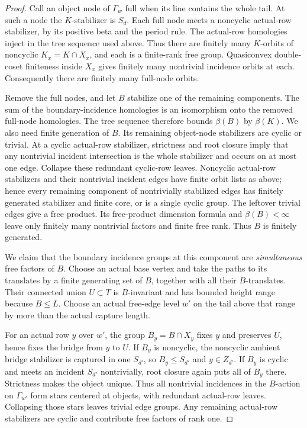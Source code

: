 \begin{proof}
Call an object node of $\Gamma_w$ full when its line contains the
whole tail. At such a node the $K$-stabilizer is $S_d$. Each full
node meets a noncyclic actual-row stabilizer, by its positive beta
and the period rule. The actual-row homologies inject in the tree
sequence used above. Thus there are finitely many $K$-orbits of
noncyclic $K_x=K\cap X_x$, and each is a finite-rank free group.
Quasiconvex double-coset finiteness inside $X_x$ gives finitely many
nontrivial incidence orbits at each. Consequently there are finitely
many full-node orbits.

Remove the full nodes, and let $B$ stabilize one of the remaining
components. The sum of the boundary-incidence homologies is an
isomorphism onto the removed full-node homologies. The tree sequence
therefore bounds $\beta(B)$ by $\beta(K)$. We also need finite
generation of $B$. Its remaining object-node stabilizers are cyclic
or trivial. At a cyclic actual-row stabilizer, strictness and root
closure imply that any nontrivial incident intersection is the whole
stabilizer and occurs on at most one edge. Collapse these redundant
cyclic-row leaves. Noncyclic actual-row stabilizers and their
nontrivial incident edges have finite orbit lists as above; hence
every remaining component of nontrivially stabilized edges has
finitely generated stabilizer and finite core, or is a single cyclic
group. The leftover trivial edges give a free product. Its
free-product dimension formula and $\beta(B)<\infty$ leave only
finitely many nontrivial factors and finite free rank. Thus $B$ is
finitely generated.

We claim that the boundary incidence groups at this component are
\emph{simultaneous} free factors of $B$. Choose an actual base vertex
and take the paths to its translates by a finite generating set of
$B$, together with all their $B$-translates. Their connected union
$U\subset T$ is $B$-invariant and has bounded height range because
$B\le L$. Choose an actual free-edge level $w'$ on the tail above
that range by more than the actual capture length.

For an actual row $y$ over $w'$, the group $B_y=B\cap X_y$ fixes
$y$ and preserves $U$, hence fixes the bridge from $y$ to $U$.
If $B_y$ is noncyclic, the noncyclic ambient bridge stabilizer is
captured in one $S_{d'}$, so $B_y\le S_{d'}$ and $y\in Z_{d'}$.
If $B_y$ is cyclic and meets an incident $S_{d'}$ nontrivially,
root closure again puts all of $B_y$ there. Strictness makes the
object unique. Thus all nontrivial incidences in the $B$-action on
$\Gamma_{w'}$ form stars centered at objects, with redundant
actual-row leaves. Collapsing those stars leaves trivial edge
groups. Any remaining actual-row stabilizers are cyclic and
contribute free factors of rank one.


\end{proof}
